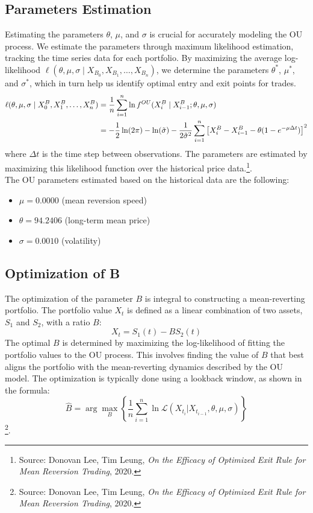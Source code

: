 \documentclass{article}
\begin{document}
\subsection*{Parameters Estimation}
Estimating the parameters \( \theta \), \( \mu \), and \( \sigma \) is crucial for accurately modeling the OU process. We estimate the parameters through maximum likelihood estimation, tracking the time series data for each portfolio. By maximizing the average log-likelihood $\ell(\theta, \mu, \sigma \mid X_{B_0}, X_{B_1}, \ldots, X_{B_n})$, we determine the parameters $\theta^*$, $\mu^*$, and $\sigma^*$, which in turn help us identify optimal entry and exit points for trades.
\begin{align}
\ell(\theta, \mu, \sigma \mid X_0^B, X_1^B, \ldots, X_n^B) &= \frac{1}{n} \sum_{i=1}^n \ln f^{OU}(X_i^B \mid X_{i-1}^B; \theta, \mu, \sigma) \notag \\
&= -\frac{1}{2} \ln(2\pi) - \ln(\tilde{\sigma}) - \frac{1}{2 \tilde{\sigma}^2} \sum_{i=1}^n \left[ X_i^B - X_{i-1}^B - \theta (1 - e^{-\mu \Delta t}) \right]^2
\end{align}
where \( \Delta t \) is the time step between observations. The parameters are estimated by maximizing this likelihood function over the historical price data.\footnote{Source: Donovan Lee, Tim Leung, \textit{On the Efficacy of Optimized Exit Rule for Mean Reversion Trading}, 2020.}.\\

The OU parameters estimated based on the historical data are the following:
\begin{itemize}
    \item $\mu = 0.0000$ \quad (mean reversion speed)
    \item $\theta = 94.2406$ \quad (long-term mean price)
    \item $\sigma = 0.0010$ \quad (volatility)
\end{itemize}

\subsection*{Optimization of B}
The optimization of the parameter \( B \) is integral to constructing a mean-reverting portfolio. The portfolio value \( X_t \) is defined as a linear combination of two assets, \( S_1 \) and \( S_2 \), with a ratio \( B \):
\begin{equation}
X_t = S_1(t) - B S_2(t)
\end{equation}
The optimal \( B \) is determined by maximizing the log-likelihood of fitting the portfolio values to the OU process. This involves finding the value of \( B \) that best aligns the portfolio with the mean-reverting dynamics described by the OU model. The optimization is typically done using a lookback window, as shown in the formula:
\begin{equation}
\hat{B} = \arg \max_{B} \left\{ \frac{1}{n} \sum_{i=1}^{n} \ln \mathcal{L} \left( X_{t_i} | X_{t_{i-1}}, \theta, \mu, \sigma \right) \right\}
\end{equation} \footnote{Source: Donovan Lee, Tim Leung, \textit{On the Efficacy of Optimized Exit Rule for Mean Reversion Trading}, 2020.}.\\
\end{document}
